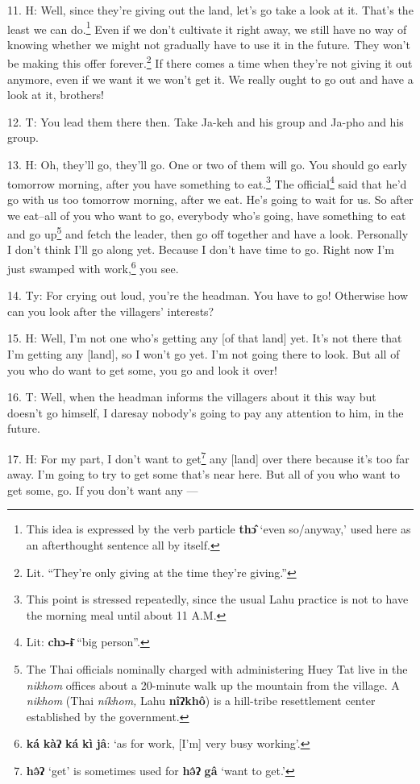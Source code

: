 11. H: Well, since they're giving out the land, let's go take a look at it. That's
the least we can do.\footnote{This idea is expressed by the verb particle \textbf{thɔ̂} `even so/anyway,' used here as an afterthought sentence all by itself.} Even if we don't cultivate it right away, we still have
no way of knowing whether we might not gradually have to use it in the future.
They won't be making this offer forever.\footnote{Lit. ``They're only giving at the time they're giving.''} If there comes a time when they're
not giving it out anymore, even if we want it we won't get it. We really ought
to go out and have a look at it, brothers!

12. T: You lead them there then. Take Ja-keh and his group and Ja-pho and his
group.

13. H: Oh, they'll go, they'll go. One or two of them will go. You should go early
tomorrow morning, after you have something to eat.\footnote{This point is stressed repeatedly, since the usual Lahu practice is not to have the morning meal until about 11 A.M.} The official\footnote{Lit: \textbf{chɔ-ɨ̄} ``big person''.} said that
he'd go with us too tomorrow morning, after we eat. He's going to wait for us.
So after we eat--all of you who want to go, everybody who's going, have something
to eat and go up\footnote{The Thai officials nominally charged with administering Huey Tat live in the \textit{nikhom } offices about a 20-minute walk up the mountain from the village. A \textit{nikhom } (Thai \textit{níkhom, }Lahu \textbf{nîʔkhô}) is a hill-tribe resettlement center established by the government.} and fetch the leader, then go off together and have a look.
Personally I don't think I'll go along yet. Because I don't have time to go. Right
now I'm just swamped with work,\footnote{\textbf{ká} \textbf{kàʔ} \textbf{ká} \textbf{kì} \textbf{jâ}: `as for work, [I'm] very busy working'.} you see.

14. Ty: For crying out loud, you're the headman. You have to go! Otherwise
how can you look after the villagers' interests?

15. H: Well, I'm not one who's getting any [of that land] yet. It's not there that
I'm getting any [land], so I won't go yet. I'm not going there to look. But all
of you who do want to get some, you go and look it over!

16. T: Well, when the headman informs the villagers about it this way but doesn't
go himself, I daresay nobody's going to pay any attention to him, in the future.

17. H: For my part, I don't want to get\footnote{\textbf{hə̂ʔ} `get' is sometimes used for \textbf{hə̂ʔ} \textbf{gâ} `want to get.'} any [land] over there because it's too
far away. I'm going to try to get some that's near here. But all of you who want
to get some, go. If you don't want any ---

